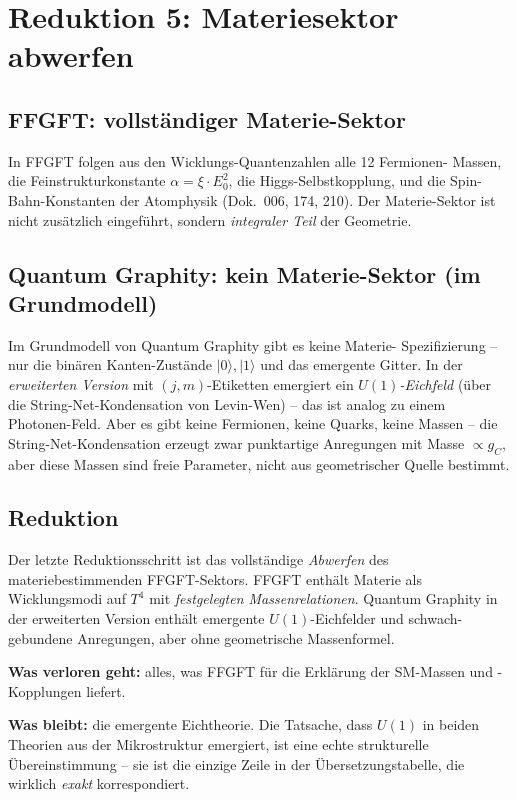 \section{Reduktion 5: Materiesektor abwerfen}

\subsection{FFGFT: vollständiger Materie-Sektor}

In FFGFT folgen aus den Wicklungs-Quantenzahlen alle 12 Fermionen-
Massen, die Feinstrukturkonstante $\alpha = \xi \cdot E_0^2$, die
Higgs-Selbstkopplung, und die Spin-Bahn-Konstanten der Atomphysik
(Dok.~006, 174, 210). Der Materie-Sektor ist nicht zusätzlich
eingeführt, sondern \emph{integraler Teil} der Geometrie.

\subsection{Quantum Graphity: kein Materie-Sektor (im Grundmodell)}

Im Grundmodell von Quantum Graphity gibt es keine Materie-
Spezifizierung -- nur die binären Kanten-Zustände $|0\rangle, |1\rangle$
und das emergente Gitter. In der \emph{erweiterten Version} mit
$(j, m)$-Etiketten emergiert ein \emph{$U(1)$-Eichfeld} (über die
String-Net-Kondensation von Levin-Wen) -- das ist analog zu einem
Photonen-Feld. Aber es gibt keine Fermionen, keine Quarks, keine
Massen -- die String-Net-Kondensation erzeugt zwar punktartige
Anregungen mit Masse $\propto g_C$, aber diese Massen sind freie
Parameter, nicht aus geometrischer Quelle bestimmt.

\subsection{Reduktion}

Der letzte Reduktionsschritt ist das vollständige \emph{Abwerfen}
des materiebestimmenden FFGFT-Sektors. FFGFT enthält Materie als
Wicklungsmodi auf $T^4$ mit \emph{festgelegten Massenrelationen}.
Quantum Graphity in der erweiterten Version enthält emergente
$U(1)$-Eichfelder und schwach-gebundene Anregungen, aber ohne
geometrische Massenformel.

\textbf{Was verloren geht:} alles, was FFGFT für die Erklärung der
SM-Massen und -Kopplungen liefert.

\textbf{Was bleibt:} die emergente Eichtheorie. Die Tatsache, dass
$U(1)$ in beiden Theorien aus der Mikrostruktur emergiert, ist eine
echte strukturelle Übereinstimmung -- sie ist die einzige Zeile in
der Übersetzungstabelle, die wirklich \emph{exakt} korrespondiert.

